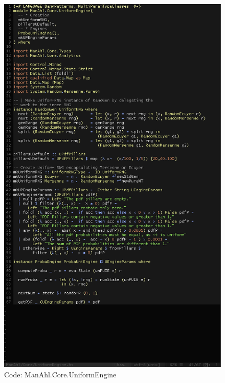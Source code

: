 \documentclass[12pt,a4paper,article]{memoir} %
\begin{document}
\begin{figure}[h!]
\centering
\includegraphics[width=1\textwidth]{img/code-ue.png}
\caption{Code: ManAhl.Core.UniformEngine}
\label{fig:core.u}
\end{figure}
\end{document}

